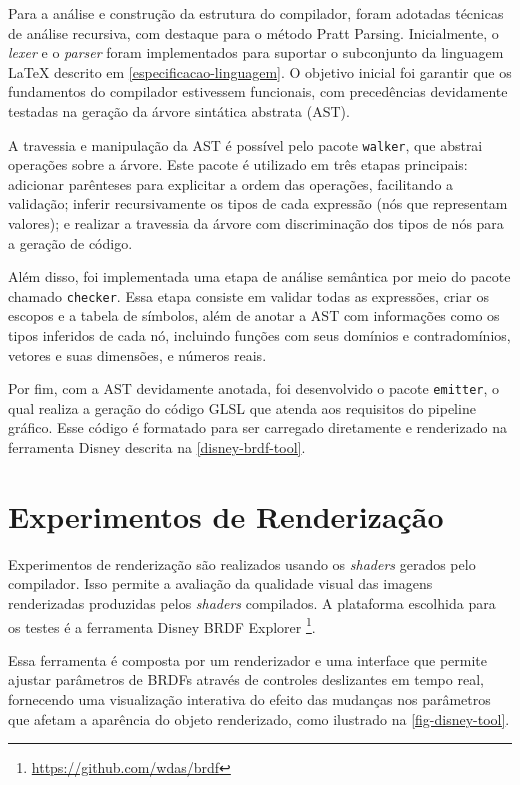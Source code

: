 Para a análise e construção da estrutura do compilador, foram adotadas técnicas de análise recursiva, com destaque para o método Pratt Parsing. Inicialmente, o \textit{lexer} e o \textit{parser} foram implementados para suportar o subconjunto da linguagem \LaTeX{} descrito em \autoref{especificacao-linguagem}. O objetivo inicial foi garantir que os fundamentos do compilador estivessem funcionais, com precedências devidamente testadas na geração da árvore sintática abstrata (AST).

A travessia e manipulação da AST é possível pelo pacote \texttt{walker}, que abstrai operações sobre a árvore. Este pacote é utilizado em três etapas principais: adicionar parênteses para explicitar a ordem das operações, facilitando a validação; inferir recursivamente os tipos de cada expressão (nós que representam valores); e realizar a travessia da árvore com discriminação dos tipos de nós para a geração de código.


Além disso, foi implementada uma etapa de análise semântica por meio do pacote chamado \texttt{checker}. Essa etapa consiste em validar todas as expressões, criar os escopos e a tabela de símbolos, além de anotar a AST com informações como os tipos inferidos de cada nó, incluindo funções com seus domínios e contradomínios, vetores e suas dimensões, e números reais.

Por fim, com a AST devidamente anotada, foi desenvolvido o pacote \texttt{emitter}, o qual realiza a geração do código GLSL que atenda aos requisitos do pipeline gráfico. Esse código é formatado para ser carregado diretamente e renderizado na ferramenta Disney descrita na \autoref{disney-brdf-tool}.

\section{Experimentos de Renderização} \label{experimentos-renderizacao}


Experimentos de renderização são realizados usando os \textit{shaders} gerados pelo compilador. Isso permite a avaliação da qualidade visual das imagens renderizadas produzidas pelos \textit{shaders} compilados. A plataforma escolhida para os testes é a ferramenta \label{disney-brdf-tool} Disney BRDF Explorer \footnote{\url{https://github.com/wdas/brdf}}.


Essa ferramenta é composta por um renderizador e uma interface que permite ajustar parâmetros de BRDFs através de controles deslizantes em tempo real, fornecendo uma visualização interativa do efeito das mudanças nos parâmetros que afetam a aparência do objeto renderizado, como ilustrado na \autoref{fig-disney-tool}.


